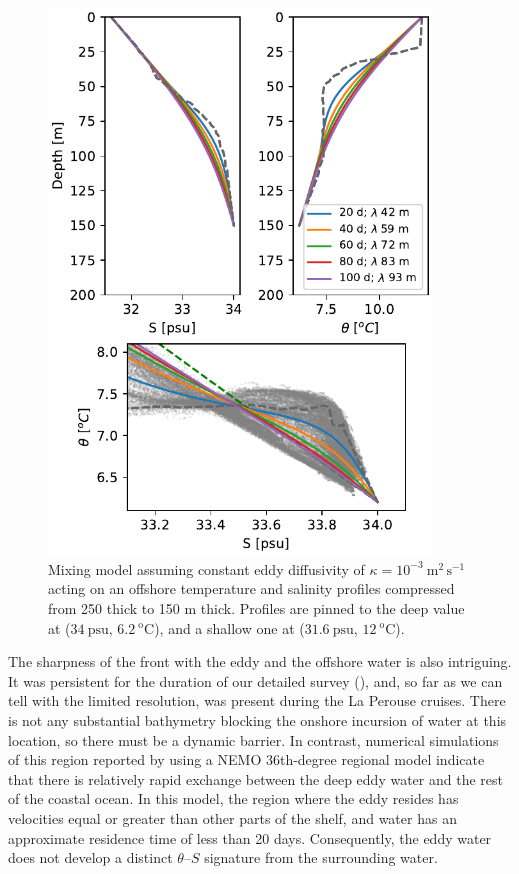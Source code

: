 \documentclass[draft]{agujournal2019}
\begin{document}
\begin{figure}[htbp]
  \begin{center}
    \includegraphics[width=4in]{TSExercise}
    \caption{Mixing model assuming constant eddy diffusivity of $\kappa = 10^{-3}\ \mathrm{m^2\,s^{-1}}$ acting on an offshore temperature and salinity profiles compressed from 250 thick to 150 m thick.  Profiles are pinned to the deep value at ($34\ \mathrm{psu}$, $6.2\ \mathrm{^oC}$), and a shallow one at ($31.6\ \mathrm{psu}$, $12\ \mathrm{^oC}$).
      \label{fig:TSExercise} }
  \end{center}
\end{figure}

The sharpness of the front with the eddy and the offshore water is also intriguing.  It was persistent for the duration of our detailed survey (), and, so far as we can tell with the limited resolution, was present during the La Perouse cruises. There is not any substantial bathymetry blocking the onshore incursion of water at this location, so there must be a dynamic barrier. In contrast, numerical simulations of this region reported by \cite{sahuetal22} using a NEMO 36th-degree regional model indicate that there is relatively rapid exchange between the deep eddy water and the rest of the coastal ocean.  In this model, the region where the eddy resides has velocities equal or greater than other parts of the shelf, and water has an approximate residence time of less than 20 days.  Consequently, the eddy water does not develop a distinct $\theta$--$S$ signature from the surrounding water.
\end{document}

